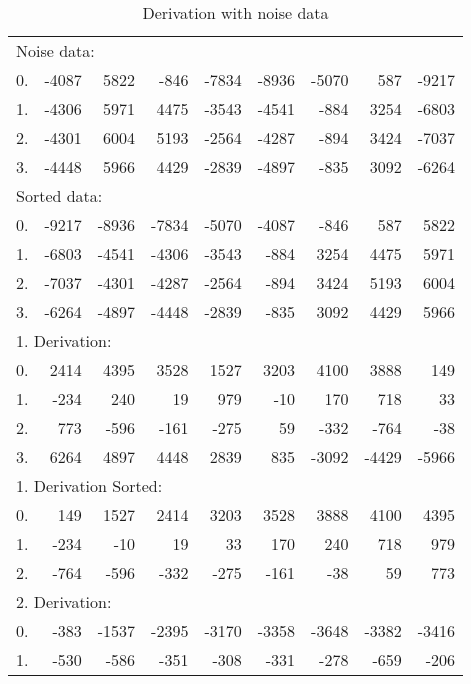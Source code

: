 \begin{table}[htp]
\begin{center}
\begin{tabular}{lrrrrrrrr}
\toprule
\multicolumn{9}{l}{Noise data:} \\
0. & -4087 & 5822 & -846 & -7834 & -8936 & -5070 & 587 & -9217 \\
1. & -4306 & 5971 & 4475 & -3543 & -4541 & -884 & 3254 & -6803 \\
2. & -4301 & 6004 & 5193 & -2564 & -4287 & -894 & 3424 & -7037 \\
3. & -4448 & 5966 & 4429 & -2839 & -4897 & -835 & 3092 & -6264 \\
\midrule
\multicolumn{9}{l}{Sorted data:} \\
0. & -9217 & -8936 & -7834 & -5070 & -4087 & -846 &  587 & 5822 \\
1. & -6803 & -4541 & -4306 & -3543 & -884 &  3254 &  4475 &  5971 \\
2. & -7037 & -4301 & -4287 & -2564 & -894 &  3424 &  5193 &  6004 \\
3. & -6264 & -4897 & -4448 & -2839 & -835 &  3092 &  4429 &  5966 \\
\midrule
\multicolumn{9}{l}{1. Derivation:} \\
0. & 2414 &  4395 &  3528 &  1527 &  3203 &  4100 &  3888 &  149 \\
1. & -234 &  240 & 19 &  979 & -10 & 170 & 718 & 33 \\
2. & 773  & -596 &  -161 &  -275 &  59  & -332 &  -764 &  -38 \\
3. & 6264 &  4897 &  4448 &  2839 &  835  & -3092 & -4429 & -5966 \\
\midrule
\multicolumn{9}{l}{1. Derivation Sorted:} \\
0. &  149 & 1527 & 2414 & 3203 & 3528 & 3888 & 4100 & 4395 \\
1. &  -234 & -10 & 19 & 33 & 170 & 240 & 718 & 979 \\
2. &  -764 &  -596 & -332 & -275 & -161 & -38 & 59 & 773 \\
\midrule
\multicolumn{9}{l}{2. Derivation:} \\
0. & -383 & -1537 & -2395 & -3170 & -3358 & -3648 & -3382 & -3416 \\
1. & -530 & -586 & -351 & -308 & -331 & -278 & -659 & -206 \\
\midrule
\end{tabular}
\end{center}
\label{tbl:derivations_noise_data}
\caption{Derivation with noise data}
\end{table}

